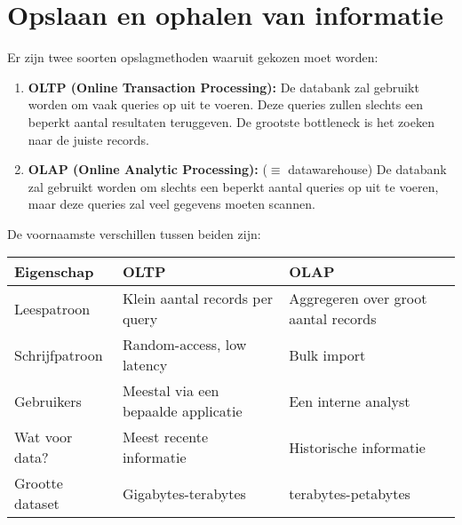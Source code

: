 	\chapter{Opslaan en ophalen van informatie}
	Er zijn twee soorten opslagmethoden waaruit gekozen moet worden:
	\begin{enumerate}
		\item[\info] \textbf{OLTP (Online Transaction Processing):} De databank zal gebruikt worden om vaak queries op uit te voeren. Deze queries zullen slechts een beperkt aantal resultaten teruggeven. De grootste bottleneck is het zoeken naar de juiste records.
		\item[\info] \textbf{OLAP (Online Analytic Processing):} ($\equiv$ datawarehouse) De databank zal gebruikt worden om slechts een beperkt aantal queries op uit te voeren, maar deze queries zal veel gegevens moeten scannen.
	\end{enumerate}
	De voornaamste verschillen tussen beiden zijn:
	\begin{table}[ht]
		\begin{tabular}{l | l l}
			Eigenschap & OLTP & OLAP \\
			\hline
			Leespatroon & Klein aantal records per query & Aggregeren over groot aantal records \\
			Schrijfpatroon & Random-access, low latency & Bulk import \\
			Gebruikers & Meestal via een bepaalde applicatie & Een interne analyst \\
			Wat voor data? & Meest recente informatie & Historische informatie \\
			Grootte dataset & Gigabytes-terabytes & terabytes-petabytes 
		\end{tabular}
	\end{table}

